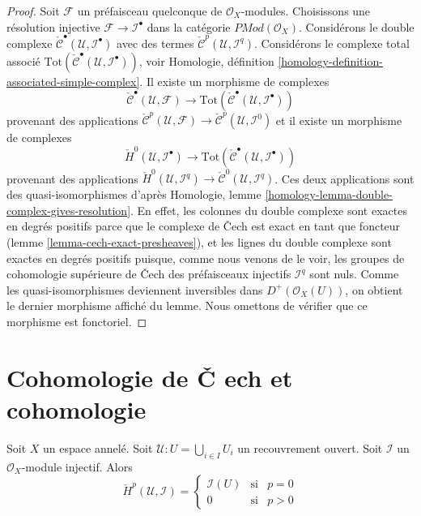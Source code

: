\begin{proof}
Soit $\mathcal{F}$ un préfaisceau quelconque de $\mathcal{O}_X$-modules. Choisissons une résolution injective $\mathcal{F} \to \mathcal{I}^\bullet$
dans la catégorie $\textit{PMod}(\mathcal{O}_X)$. Considérons le double complexe
$\check{\mathcal{C}}^\bullet(\mathcal{U}, \mathcal{I}^\bullet)$ avec des termes
$\check{\mathcal{C}}^p(\mathcal{U}, \mathcal{I}^q)$. Considérons le complexe total associé
$\text{Tot}(\check{\mathcal{C}}^\bullet(\mathcal{U}, \mathcal{I}^\bullet))$, voir Homologie, définition \ref{homology-definition-associated-simple-complex}. Il existe un morphisme de complexes
$$
\check{\mathcal{C}}^\bullet(\mathcal{U}, \mathcal{F})
\longrightarrow
\text{Tot}(\check{\mathcal{C}}^\bullet(\mathcal{U}, \mathcal{I}^\bullet))
$$
provenant des applications
$\check{\mathcal{C}}^p(\mathcal{U}, \mathcal{F})
\to \check{\mathcal{C}}^p(\mathcal{U}, \mathcal{I}^0)$
et il existe un morphisme de complexes
$$
\check{H}^0(\mathcal{U}, \mathcal{I}^\bullet)
\longrightarrow
\text{Tot}(\check{\mathcal{C}}^\bullet(\mathcal{U}, \mathcal{I}^\bullet))
$$
provenant des applications
$\check{H}^0(\mathcal{U}, \mathcal{I}^q) \to
\check{\mathcal{C}}^0(\mathcal{U}, \mathcal{I}^q)$. Ces deux applications sont des quasi-isomorphismes d'après Homologie, lemme \ref{homology-lemma-double-complex-gives-resolution}. En effet, les colonnes du double complexe sont exactes en degrés positifs parce que le complexe de {\v C}ech est exact en tant que foncteur (lemme \ref{lemma-cech-exact-presheaves}), et les lignes du double complexe sont exactes en degrés positifs puisque, comme nous venons de le voir, les groupes de cohomologie supérieure de {\v C}ech des préfaisceaux injectifs $\mathcal{I}^q$ sont nuls. Comme les quasi-isomorphismes deviennent inversibles dans $D^{+}(\mathcal{O}_X(U))$, on obtient le dernier morphisme affiché du lemme. Nous omettons de vérifier que ce morphisme est fonctoriel.

\end{proof}





\section{Cohomologie de {\v C}
ech et cohomologie}
\label{section-cech-cohomology-cohomology}

\begin{lemma}

\label{lemma-injective-trivial-cech}
Soit $X$ un espace annelé. Soit $\mathcal{U} : U = \bigcup_{i \in I} U_i$ un recouvrement ouvert. Soit $\mathcal{I}$ un $\mathcal{O}_X$-module injectif. Alors $$
\check{H}^p(\mathcal{U}, \mathcal{I}) =
\left\{
\begin{matrix}
\mathcal{I}(U) & \text{si} & p = 0 \\
0 & \text{si} & p > 0
\end{matrix}
\right.
$$
\end{lemma}

